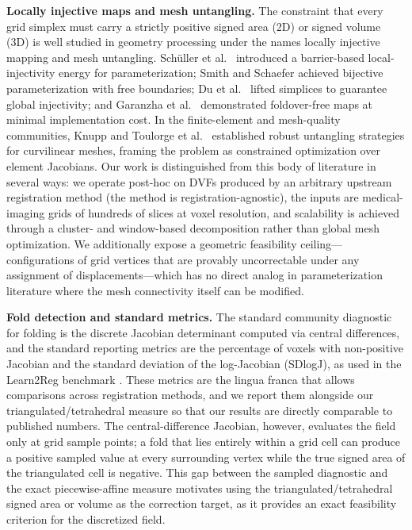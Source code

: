 \documentclass[lettersize,journal]{IEEEtran}
\begin{document}
\textbf{Locally injective maps and mesh untangling.} The constraint that every grid simplex must carry a strictly positive signed area (2D) or signed volume (3D) is well studied in geometry processing under the names locally injective mapping and mesh untangling. Schüller et al.\ \cite{schuller2013lim} introduced a barrier-based local-injectivity energy for parameterization; Smith and Schaefer \cite{smith2015bijective} achieved bijective parameterization with free boundaries; Du et al.\ \cite{du2020lifting} lifted simplices to guarantee global injectivity; and Garanzha et al.\ \cite{garanzha2021foldfree} demonstrated foldover-free maps at minimal implementation cost. In the finite-element and mesh-quality communities, Knupp \cite{knupp2001untangling} and Toulorge et al.\ \cite{toulorge2013robust} established robust untangling strategies for curvilinear meshes, framing the problem as constrained optimization over element Jacobians. Our work is distinguished from this body of literature in several ways: we operate post-hoc on DVFs produced by an arbitrary upstream registration method (the method is registration-agnostic), the inputs are medical-imaging grids of hundreds of slices at voxel resolution, and scalability is achieved through a cluster- and window-based decomposition rather than global mesh optimization. We additionally expose a geometric feasibility ceiling---configurations of grid vertices that are provably uncorrectable under any assignment of displacements---which has no direct analog in parameterization literature where the mesh connectivity itself can be modified.

\textbf{Fold detection and standard metrics.} The standard community diagnostic for folding is the discrete Jacobian determinant computed via central differences, and the standard reporting metrics are the percentage of voxels with non-positive Jacobian and the standard deviation of the log-Jacobian (SDlogJ), as used in the Learn2Reg benchmark \cite{learn2reg2023}. These metrics are the lingua franca that allows comparisons across registration methods, and we report them alongside our triangulated/tetrahedral measure so that our results are directly comparable to published numbers. The central-difference Jacobian, however, evaluates the field only at grid sample points; a fold that lies entirely within a grid cell can produce a positive sampled value at every surrounding vertex while the true signed area of the triangulated cell is negative. This gap between the sampled diagnostic and the exact piecewise-affine measure motivates using the triangulated/tetrahedral signed area or volume as the correction target, as it provides an exact feasibility criterion for the discretized field.
\end{document}

